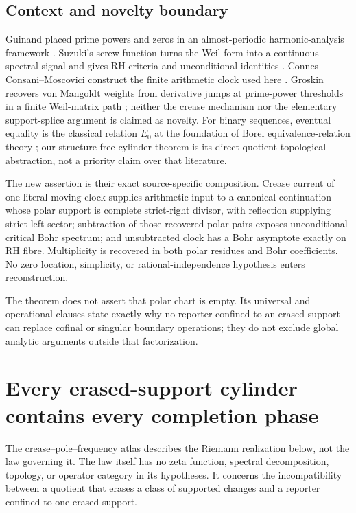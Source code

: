 \documentclass[11pt]{article}
\theoremstyle{definition}
\theoremstyle{remark}
\begin{document}
\subsection*{Context and novelty boundary}

Guinand placed prime powers and zeros in an almost-periodic harmonic-analysis framework
\cite{Guinand1959}.  Suzuki's screw function turns the Weil form into a continuous spectral
signal and gives RH criteria and unconditional identities \cite{Suzuki2023,Suzuki2026}.
Connes--Consani--Moscovici construct the finite arithmetic clock used here
\cite{ConnesConsaniMoscovici2025}.  Groskin recovers von Mangoldt weights from derivative jumps
at prime-power thresholds in a finite Weil-matrix path \cite{GroskinMangoldt2026}; neither the
crease mechanism nor the elementary support-splice argument is claimed as novelty.
For binary sequences, eventual equality is the classical relation $E_0$ at the foundation of
Borel equivalence-relation theory \cite{HarringtonKechrisLouveau1990}; our structure-free
cylinder theorem is its direct quotient-topological abstraction, not a priority claim over that
literature.

The new assertion is their exact source-specific composition.  Crease current of one literal moving
clock supplies arithmetic input to a canonical continuation whose polar support is complete
strict-right divisor, with reflection supplying strict-left sector; subtraction of those recovered
polar pairs exposes unconditional critical
Bohr spectrum; and unsubtracted clock has a Bohr asymptote exactly on RH fibre.  Multiplicity is
recovered in both polar residues and Bohr coefficients.  No zero location, simplicity, or
rational-independence hypothesis enters reconstruction.

The theorem does not assert that polar chart is empty.  Its universal and operational clauses
state exactly why no reporter confined to an erased support can replace cofinal or singular
boundary operations;
they do not exclude global analytic arguments outside that factorization.


\section{Every erased-support cylinder contains every completion phase}
\label{sec:finite-completion}

The crease--pole--frequency atlas describes the Riemann realization below, not the law
governing it.  The law itself has no zeta function, spectral decomposition, topology, or operator
category in its hypotheses.  It concerns the incompatibility between a quotient that erases a
class of supported changes and a reporter confined to one erased support.
\end{document}
